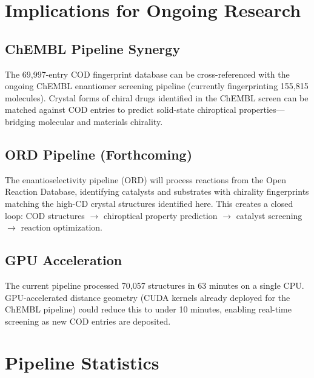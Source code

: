 \documentclass[11pt,a4paper]{article}
\begin{document}
\section{Implications for Ongoing Research}

\subsection{ChEMBL Pipeline Synergy}

The 69,997-entry COD fingerprint database can be cross-referenced with the ongoing ChEMBL enantiomer screening pipeline (currently fingerprinting 155,815 molecules). Crystal forms of chiral drugs identified in the ChEMBL screen can be matched against COD entries to predict solid-state chiroptical properties---bridging molecular and materials chirality.

\subsection{ORD Pipeline (Forthcoming)}

The enantioselectivity pipeline (ORD) will process reactions from the Open Reaction Database, identifying catalysts and substrates with chirality fingerprints matching the high-CD crystal structures identified here. This creates a closed loop: COD structures $\to$ chiroptical property prediction $\to$ catalyst screening $\to$ reaction optimization.

\subsection{GPU Acceleration}

The current pipeline processed 70,057 structures in 63 minutes on a single CPU. GPU-accelerated distance geometry (CUDA kernels already deployed for the ChEMBL pipeline) could reduce this to under 10 minutes, enabling real-time screening as new COD entries are deposited.

\section{Pipeline Statistics}
\end{document}
